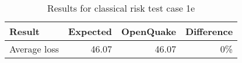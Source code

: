 \begin{table}[htbp]

\centering
\begin{tabular}{ l r r r }

\hline
\rowcolor{anti-flashwhite}
\bf{Result} & \bf{Expected} & \bf{OpenQuake} & \bf{Difference}\\
\hline
Average loss & 46.07 & 46.07 & 0\% \\
\hline
\end{tabular}

\caption{Results for classical risk test case 1e}
\label{tab:result-classical-risk-1e}
\end{table}